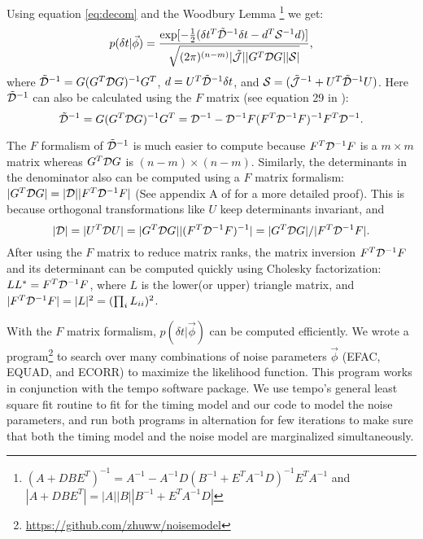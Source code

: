 {Using equation \ref{eq:decom} and the Woodbury Lemma
\footnote{$(A+DBE^T)^{-1}=A^{-1}-A^{-1}D(B^{-1}+E^TA^{-1}D)^{-1}E^TA^{-1}$ and
$|A+DBE^T| = |A||B||B^{-1}+E^TA^{-1}D|$} we get:
\begin{equation}
\label{eq:Gform}
p(\delta t|\vec \phi) = \frac{\exp[-\frac{1}{2}(\delta t^T \tilde{\mathcal{D}}^{-1} \delta t -
d^T\mathcal{S}^{-1} d)]}{\sqrt{(2\pi)^{(n-m)}|\tilde{\mathcal{J}}||G^T \mathcal{D}
G||\mathcal{S}|}},
\end{equation}
where $\tilde{\mathcal{D}}^{-1} = G(G^T \mathcal{D} G)^{-1}G^T$, $d=U^T \tilde{\mathcal{D}}^{-1}\delta
t$, and $\mathcal{S} = (\tilde{\mathcal{J}}^{-1} + U^T \tilde{\mathcal{D}}^{-1}U)$.
Here $\tilde{\mathcal{D}}^{-1}$ can also be calculated using the $F$ matrix 
(see equation 29 in \citealt{vv14a}):
\begin{equation}
\label{eq:tildeD}
\tilde{\mathcal{D}}^{-1} = G(G^T\mathcal{D} G)^{-1}G^T = \mathcal{D}^{-1} -
\mathcal{D}^{-1}F(F^T\mathcal{D}^{-1}F)^{-1}F^T\mathcal{D}^{-1}.
\end{equation}

The $F$ formalism of $\tilde{\mathcal{D}}^{-1}$ is much easier to compute because $F^T\mathcal{D}^{-1}F$ is a $m\times m$ matrix whereas $G^T\mathcal{D} G$ is $(n-m)\times(n-m)$.
Similarly, the determinants in the denominator also can be computed using a $F$ matrix formalism: $|G^{T}\mathcal{D} G| = |\mathcal{D}||F^T\mathcal{D}^{-1}F|$ (See appendix A of \citet{vv14a} for a more detailed proof).
This is because orthogonal transformations like $U$ keep determinants invariant, and 
\begin{equation}
|\mathcal{D}| = |U^T \mathcal{D} U| = |G^T\mathcal{D} G||(F^T\mathcal{D}^{-1}F)^{-1}| = |G^T\mathcal{D} G|/|F^T
\mathcal{D}^{-1} F|.
\end{equation}
After using the $F$ matrix to reduce matrix ranks, the matrix inversion
$F^T\mathcal{D}^{-1}F$ and its determinant can be computed quickly using Cholesky
factorization:
$LL^* = F^T\mathcal{D}^{-1}F$, where $L$ is the lower(or upper) triangle matrix, and $|F^T\mathcal{D}^{-1}F| = |L|^2 = (\prod_i L_{ii})^2$.

With the $F$ matrix formalism, $p(\delta t|\vec \phi)$ can be computed
efficiently. 
We wrote a program\footnote{\url{https://github.com/zhuww/noisemodel}} to search over many combinations of noise parameters $\vec
\phi$ (EFAC, EQUAD, and ECORR) to maximize the likelihood
function. This program works in conjunction with the {\sc tempo} software package.
We use {\sc tempo}'s general least square fit routine to fit for the
timing model and our code to model the noise parameters, and run both programs
in alternation for few iterations to make sure that both the timing model and the
noise model are marginalized simultaneously.

}
